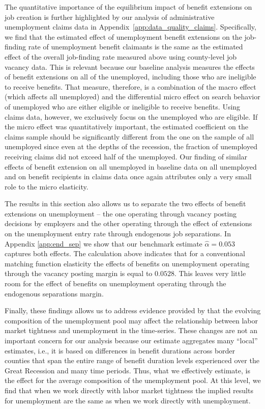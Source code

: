 \documentclass[12pt]{article}
\newcommand{\1}{\mathbf{1}}
\begin{document}
The quantitative importance of the equilibrium impact of benefit extensions on job creation is further highlighted by our analysis of administrative unemployment claims data in Appendix~\ref{app:data_quality_claims}. Specifically, we find that the estimated effect of unemployment benefit extensions on the job-finding rate of unemployment benefit claimants is the same as the estimated effect of the overall job-finding rate measured above using county-level job vacancy data. This is relevant because our baseline analysis measures the effects of benefit extensions on all of the unemployed, including those who are ineligible to receive benefits. That measure, therefore, is a combination of the macro effect (which affects all unemployed) and the differential micro effect on search behavior of unemployed who are either eligible or ineligible to receive benefits. Using claims data, however, we exclusively focus on the unemployed who are eligible. If the micro effect was quantitatively important, the estimated coefficient on the claims sample should be significantly different from the one on the sample of all unemployed since even at the depths of the recession, the fraction of unemployed receiving claims did not exceed half of the unemployed. Our finding of similar effects of benefit extension on all unemployed in baseline data on all unemployed and on benefit recipients in claims data once again attributes only a very small role to the micro elasticity.

The results in this section also allows us to separate the two effects of benefit extensions on unemployment -- the one operating through vacancy posting decisions by employers and the other operating through the effect of extensions on the unemployment entry rate through endogenous job separations. In Appendix \ref{app:end_sep} we show that our benchmark estimate $\hat{\alpha}=0.053$ captures both effects. The calculation above indicates that for a conventional matching function elasticity the effects of benefits on unemployment operating through the vacancy posting margin is equal to $0.0528$. This leaves very little room for the effect of benefits on unemployment operating through the endogenous separations margin.

Finally, these findings allows us to address evidence provided by \citet{ahn+hamilton:18} that the evolving composition of the unemployment pool may affect the relationship between labor market tightness and unemployment in the time-series. These changes are not an important concern for our analysis because our estimate aggregates many ``local'' estimates, i.e., it is based on differences in benefit durations across border counties that span the entire range of benefit duration levels experienced over the Great Recession and many time periods. Thus, what we effectively estimate, is the effect for the average composition of the unemployment pool. At this level, we find that when we work directly with labor market tightness the implied results for unemployment are the same as when we work directly with unemployment.
\end{document}
